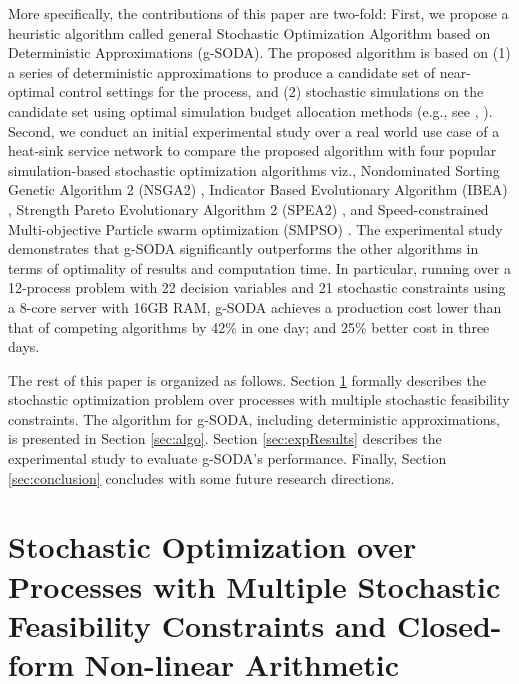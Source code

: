 \documentclass[a4paper, 12pt]{article} %
\begin{document}
More specifically, the contributions of this paper are two-fold:
First, we propose a heuristic algorithm called general Stochastic Optimization Algorithm based on Deterministic Approximations (g-SODA).
The proposed algorithm is based on (1) a series of deterministic approximations to produce a candidate set of near-optimal control settings for the process, and (2) stochastic simulations on the candidate set using optimal simulation budget allocation methods (e.g., see \cite{Chen2011}, \cite{Lee2012OCBACO}).  
Second, we conduct an initial experimental study over a real world use case of a heat-sink service network to compare the proposed algorithm with four popular simulation-based stochastic optimization algorithms viz., Nondominated Sorting Genetic Algorithm 2 (NSGA2) \cite{ngsa2}, Indicator Based Evolutionary Algorithm (IBEA) \cite{ibea}, Strength Pareto Evolutionary Algorithm 2 (SPEA2) \cite{spea2}, and Speed-constrained Multi-objective Particle swarm optimization (SMPSO) \cite{NDG09}.
 The experimental study demonstrates that g-SODA significantly outperforms the other algorithms in terms of optimality of results and computation time. In particular, 
running over a 12-process problem with 22 decision variables and 21 stochastic constraints using a 8-core server with 16GB RAM, g-SODA achieves a production cost lower than that of competing algorithms by 42\% in one day; and 25\% better cost in three days.

The rest of this paper is organized as follows. Section \ref{sec:prob} formally describes the stochastic optimization problem over processes with multiple stochastic feasibility constraints. The algorithm for g-SODA, including deterministic approximations, is presented in Section \ref{sec:algo}. Section \ref{sec:expResults} describes the experimental study to evaluate g-SODA's performance. Finally, Section \ref{sec:conclusion} concludes with some future research directions. 


\section{Stochastic Optimization over Processes with Multiple Stochastic Feasibility Constraints and Closed-form Non-linear Arithmetic}
\label{sec:prob}
\end{document}

